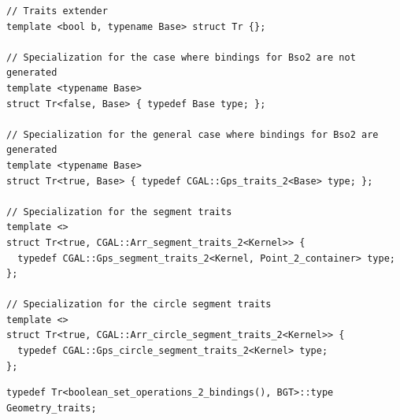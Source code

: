 \begin{lstfloat}
  \begin{lstlisting}[style=cppFramedStyle,basicstyle=\normalsize,%
                     label={lst:arrTraitsExtender},%
                     caption={2D Arrangement Traits Extender.}]
// Traits extender
template <bool b, typename Base> struct Tr {};

// Specialization for the case where bindings for Bso2 are not generated
template <typename Base>
struct Tr<false, Base> { typedef Base type; };

// Specialization for the general case where bindings for Bso2 are generated
template <typename Base>
struct Tr<true, Base> { typedef CGAL::Gps_traits_2<Base> type; };

// Specialization for the segment traits
template <>
struct Tr<true, CGAL::Arr_segment_traits_2<Kernel>> {
  typedef CGAL::Gps_segment_traits_2<Kernel, Point_2_container> type;
};

// Specialization for the circle segment traits
template <>
struct Tr<true, CGAL::Arr_circle_segment_traits_2<Kernel>> {
  typedef CGAL::Gps_circle_segment_traits_2<Kernel> type;
};
  \end{lstlisting}
\end{lstfloat}

\begin{lstfloat}
  \begin{lstlisting}[style=cppFramedStyle,basicstyle=\normalsize,%
                     label={lst:arrFinalTraits},%
                     caption={The final 2D Arrangement traits type definition.}]
typedef Tr<boolean_set_operations_2_bindings(), BGT>::type      Geometry_traits;
  \end{lstlisting}
\end{lstfloat}

